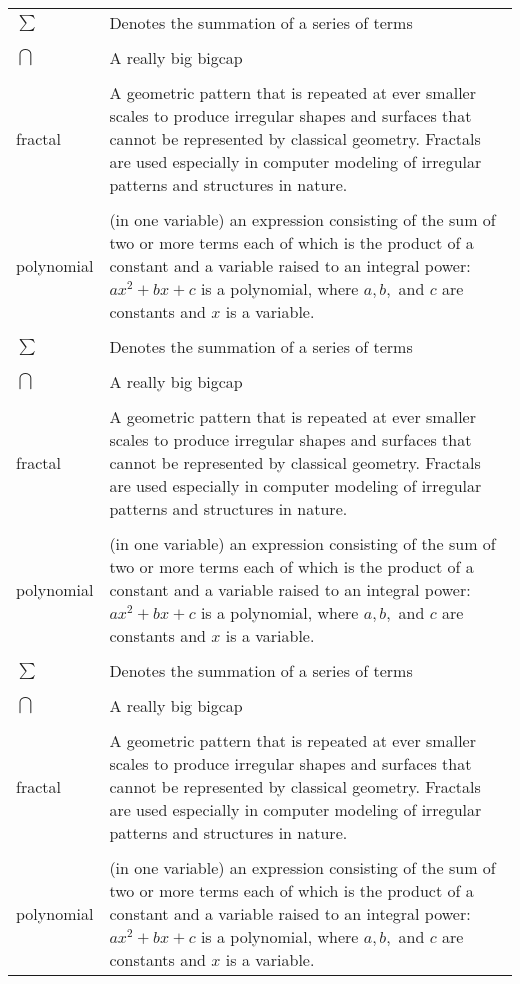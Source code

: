 \begin{tabular}{l p{5in}} %
$\sum$ & Denotes the summation of a series of terms\\
\\%
$\bigcap$ & A really big bigcap\\
\\
fractal & A geometric pattern that is repeated at ever smaller
scales to produce irregular shapes and surfaces that cannot be represented by classical
geometry. Fractals are used especially in computer modeling of irregular patterns and structures in nature.}\\
\\
polynomial & (in one variable) an expression consisting of the sum of two
or more terms each of which is the product of a constant and a
variable raised to an integral power: $ax^2 + bx + c$ is a
polynomial, where $a, b,$ and $c$ are constants and $x$ is a
variable.}\\
\\
$\sum$ & Denotes the summation of a series of terms\\
\\
$\bigcap$ & A really big bigcap\\
\\
fractal & A geometric pattern that is repeated at ever smaller
scales to produce irregular shapes and surfaces that cannot be represented by classical
geometry. Fractals are used especially in computer modeling of irregular patterns and structures in nature.}\\
\\
polynomial & (in one variable) an expression consisting of the sum of two
or more terms each of which is the product of a constant and a
variable raised to an integral power: $ax^2 + bx + c$ is a
polynomial, where $a, b,$ and $c$ are constants and $x$ is a
variable.}\\
\\
$\sum$ & Denotes the summation of a series of terms\\
\\
$\bigcap$ & A really big bigcap\\
\\
fractal & A geometric pattern that is repeated at ever smaller
scales to produce irregular shapes and surfaces that cannot be represented by classical
geometry. Fractals are used especially in computer modeling of irregular patterns and structures in nature.}\\
\\
polynomial & (in one variable) an expression consisting of the sum of two
or more terms each of which is the product of a constant and a
variable raised to an integral power: $ax^2 + bx + c$ is a
polynomial, where $a, b,$ and $c$ are constants and $x$ is a
variable.}\\

\end{tabular}

